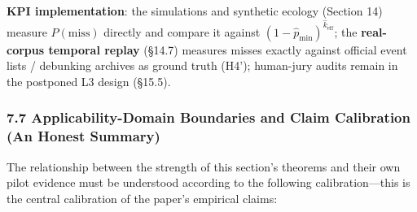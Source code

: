 \documentclass[
  11pt]{article}
\begin{document}
\textbf{KPI implementation}: the simulations and synthetic ecology
(Section 14) measure \(P(\mathrm{miss})\) directly and compare it
against \((1-\hat p_{\min})^{\hat k_{\mathrm{eff}}}\); the
\textbf{real-corpus temporal replay} (§14.7) measures misses exactly
against official event lists / debunking archives as ground truth (H4');
human-jury audits remain in the postponed L3 design (§15.5).

\subsubsection{7.7 Applicability-Domain Boundaries and Claim Calibration
(An Honest
Summary)}\label{applicability-domain-boundaries-and-claim-calibration-an-honest-summary}

The relationship between the strength of this section's theorems and
their own pilot evidence must be understood according to the following
calibration---this is the central calibration of the paper's empirical
claims:
\end{document}
